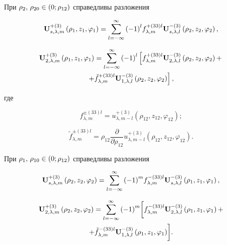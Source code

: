 \begin{theorem}
При ${\rho _2},{\mkern 1mu} {\kern 1pt} {\rho _{20}} \in \left( {0;{\rho _{12}}} \right)$ справедливы разложения

\begin{equation}\label{eq:1:109}
{\bf{U}}_{s,\lambda ,m}^{ + (3)}\left( {{\rho _1},{z_1},{\varphi _1}} \right) = \sum\limits_{l =  - \infty }^\infty  {{{( - 1)}^l}} f_{\lambda ,m}^{ + (33)l}{\bf{U}}_{s,\lambda ,l}^{ - (3)}\left( {{\rho _2},{z_2},{\varphi _2}} \right),
\end{equation}

\begin{multline}\label{eq:1:110}
{\bf{U}}_{2,\lambda ,m}^{ + (3)}\left( {{\rho _1},{z_1},{\varphi _1}} \right) = \sum\limits_{l =  - \infty }^\infty  {{{( - 1)}^l}} \left[ {f_{\lambda ,m}^{ + (33)l}{\bf{U}}_{2,\lambda ,l}^{ - (3)}\left( {{\rho _2},{z_2},{\varphi _2}} \right) + } \right.\\
\left. { + \tilde f_{\lambda ,m}^{ + (33)l}{\bf{U}}_{1,\lambda ,l}^{ - (3)}\left( {{\rho _2},{z_2},{\varphi _2}} \right)} \right],
\end{multline}

\noindent где

\begin{equation}\label{eq:1:111}
f_{\lambda ,m}^{ \pm (33)l} = u_{\lambda ,m - l}^{ + (3)}\left( {{\rho _{12}},{z_{12}},{\varphi _{12}}} \right);
\end{equation}

\begin{equation}\label{eq:1:112}
\tilde f_{\lambda ,m}^{ \pm (33)l} = {\rho _{12}}\frac{\partial }{{\partial {\rho _{12}}}}u_{\lambda ,m - l}^{ + (3)}\left( {{\rho _{12}},{z_{12}},{\varphi _{12}}} \right).
\end{equation}

При ${\rho _1},{\mkern 1mu} {\kern 1pt} {\rho _{10}} \in \left( {0;{\rho _{12}}} \right)$ справедливы разложения

\begin{equation}\label{eq:1:113}
{\bf{U}}_{s,\lambda ,m}^{ + (3)}\left( {{\rho _2},{z_2},{\varphi _2}} \right) = \sum\limits_{l =  - \infty }^\infty  {{{( - 1)}^m}} f_{\lambda ,m}^{ - (33)l}{\bf{U}}_{s,\lambda ,l}^{ - (3)}\left( {{\rho _1},{z_1},{\varphi _1}} \right),
\end{equation}

\begin{multline}\label{eq:1:114}
{\bf{U}}_{2,\lambda ,m}^{ + (3)}\left( {{\rho _2},{z_2},{\varphi _2}} \right) = \sum\limits_{l =  - \infty }^\infty  {{{( - 1)}^m}} \bigg[ {f_{\lambda ,m}^{ - (33)l}{\bf{U}}_{2,\lambda ,l}^{ - (3)}\left( {{\rho _1},{z_1},{\varphi _1}} \right) + } \\
{ + \tilde f_{\lambda ,m}^{ - (33)l}{\bf{U}}_{1,\lambda ,l}^{ - (3)}\left( {{\rho _1},{z_1},{\varphi _1}} \right)} \bigg].
\end{multline}
\end{theorem}
